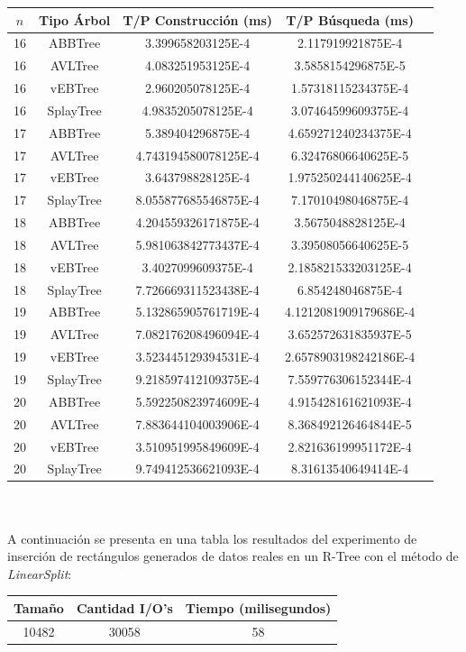 \documentclass[letterpaper,12pt]{article}
\begin{document}
\begin{tabular}{|c|c|c|c|c|}
\hline
\textbf{$n$} & \textbf{Tipo Árbol} & \textbf{T/P Construcción (ms)} & \textbf{T/P Búsqueda (ms)} \\
\hline
16 & ABBTree & 3.399658203125E-4 & 2.117919921875E-4 \\
\hline
16 & AVLTree & 4.083251953125E-4  & 3.5858154296875E-5 \\
\hline
16 & vEBTree & 2.960205078125E-4  & 1.57318115234375E-4 \\
\hline
16 & SplayTree & 4.9835205078125E-4 & 3.07464599609375E-4 \\
\hline
\hline
17 & ABBTree & 5.389404296875E-4  & 4.659271240234375E-4 \\
\hline
17 & AVLTree & 4.743194580078125E-4 & 6.32476806640625E-5 \\
\hline
17 & vEBTree & 3.643798828125E-4  & 1.975250244140625E-4\\
\hline
17 & SplayTree & 8.055877685546875E-4 & 7.17010498046875E-4 \\
\hline
\hline
18 & ABBTree & 4.204559326171875E-4 & 3.5675048828125E-4 \\
\hline
18 & AVLTree & 5.981063842773437E-4 & 3.39508056640625E-5 \\
\hline
18 & vEBTree & 3.4027099609375E-4 & 2.185821533203125E-4 \\
\hline
18 & SplayTree & 7.726669311523438E-4  & 6.854248046875E-4 \\
\hline
\hline
19 & ABBTree & 5.132865905761719E-4 & 4.1212081909179686E-4 \\
\hline
19 & AVLTree & 7.082176208496094E-4  & 3.652572631835937E-5 \\
\hline
19 & vEBTree & 3.523445129394531E-4 & 2.6578903198242186E-4\\
\hline
19 & SplayTree & 9.218597412109375E-4 & 7.559776306152344E-4 \\
\hline
\hline
20 & ABBTree & 5.592250823974609E-4 & 4.915428161621093E-4 \\
\hline
20 & AVLTree & 7.883644104003906E-4 & 8.368492126464844E-5 \\
\hline
20 & vEBTree & 3.510951995849609E-4 & 2.821636199951172E-4\\
\hline
20 & SplayTree & 9.749412536621093E-4 & 8.31613540649414E-4 \\
\hline
\end{tabular}
\\ \\

A continuación se presenta en una tabla los resultados del experimento de inserci\'on de rect\'angulos generados de datos reales en un R-Tree con el m\'etodo de \textit{LinearSplit}: \\
\begin{tabular}{|c|c|c|}
\hline
\textbf{Tama\~no} & \textbf{Cantidad I/O's} & \textbf{Tiempo (milisegundos)} \\
\hline
10482 & 30058 & 58 \\
\hline
\end{tabular}
\\ \\
\end{document}
